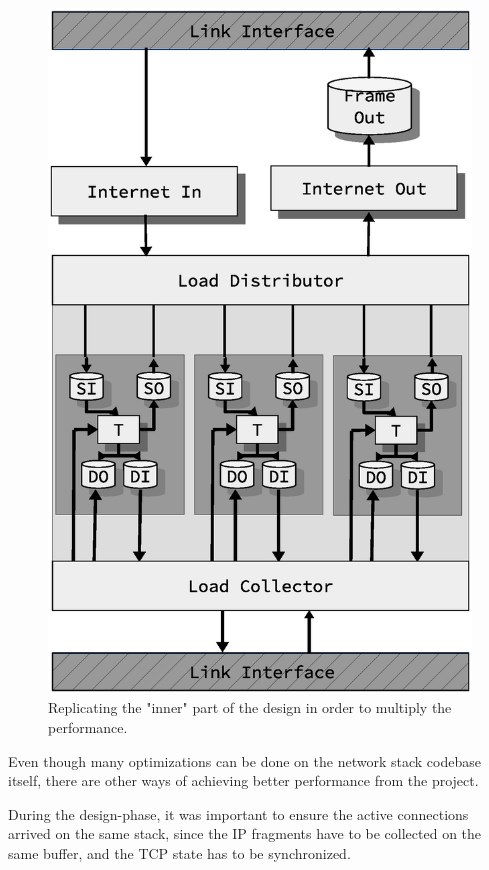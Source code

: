 \begin{figure}
\centering
\includegraphics[scale=0.45]{discussion/design_stacked.eps}
\caption{Replicating the "inner" part of the design in order to multiply the
performance. }
\label{fig:design_stacked}
\end{figure}


Even though many optimizations can be done on the network stack codebase
itself, there are other ways of achieving better performance from the project.

During the design-phase, it was important to ensure the active connections
arrived on the same stack, since the IP fragments have to be collected on the
same buffer, and the TCP state has to be synchronized.


